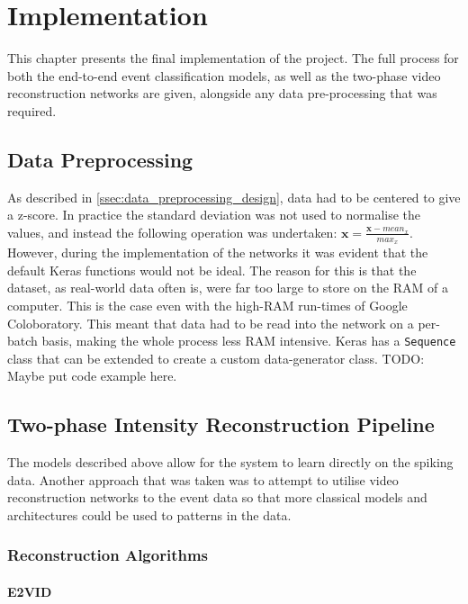 \chapter{Implementation} \label{chap:implementation}

This chapter presents the final implementation of the project. The full process for both the end-to-end event classification models, as well as the two-phase video reconstruction networks are given, alongside any data pre-processing that was required.

\section{Data Preprocessing}

As described in  \cref{ssec:data_preprocessing_design}, data had to be centered to give a z-score. In practice the standard deviation was not used to normalise the values, and instead the following operation was undertaken: $ \textbf{x} = \frac{\textbf{x} - mean_x}{max_x} $. However, during the implementation of the networks it was evident that the default Keras functions would not be ideal. The reason for this is that the dataset, as real-world data often is, were far too large to store on the RAM of a computer. This is the case even with the high-RAM run-times of Google Coloboratory. This meant that data had to be read into the network on a per-batch basis, making the whole process less RAM intensive. Keras has a \lstinline{Sequence} class that can be extended to create a custom data-generator class. \color{red} TODO: Maybe put code example here. \color{black}

\section{Two-phase Intensity Reconstruction Pipeline}

The models described above allow for the system to learn directly on the spiking data. Another approach that was taken was to attempt to utilise video reconstruction networks to the event data so that more classical models and architectures could be used to patterns in the data.

\subsection{Reconstruction Algorithms}

\subsubsection{E2VID}

